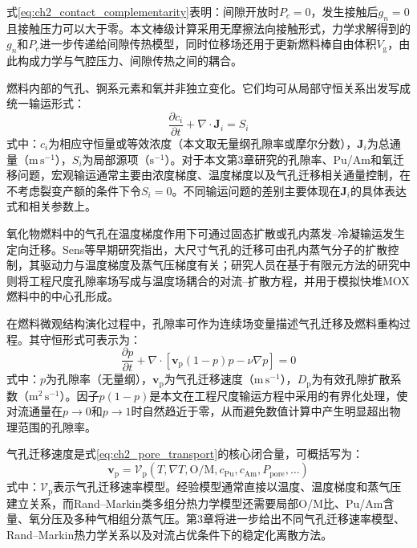 式\eqref{eq:ch2_contact_complementarity}表明：间隙开放时$P_c=0$，发生接触后$g_n=0$且接触压力可以大于零。本文棒级计算采用无摩擦法向接触形式，力学求解得到的$g_n$和$P_c$进一步传递给间隙传热模型，同时位移场还用于更新燃料棒自由体积$V_{\mathrm g}$，由此构成力学与气腔压力、间隙传热之间的耦合。

\label{sec:ch2_transport_governing}

燃料内部的气孔、锕系元素和氧并非独立变化。它们均可从局部守恒关系出发写成统一输运形式：
\begin{equation}
	\frac{\partial c_i}{\partial t}
	+\nabla\cdot\mathbf J_i
	=S_i
	\label{eq:ch2_generic_transport}
\end{equation}
\noindent 式中：$c_i$为相应守恒量或等效浓度（本文取无量纲孔隙率或摩尔分数），$\mathbf J_i$为总通量（$\mathrm{m\,s^{-1}}$），$S_i$为局部源项（$\mathrm{s^{-1}}$）。对于本文第3章研究的孔隙率、Pu/Am和氧迁移问题，宏观输运通常主要由浓度梯度、温度梯度以及气孔迁移相关通量控制，在不考虑裂变产额的条件下令$S_i=0$。不同输运问题的差别主要体现在$\mathbf J_i$的具体表达式和相关参数上。

\label{subsec:ch2_pore_transport}

氧化物燃料中的气孔在温度梯度作用下可通过固态扩散或孔内蒸发--冷凝输运发生定向迁移。Sens等早期研究指出，大尺寸气孔的迁移可由孔内蒸气分子的扩散控制，其驱动力与温度梯度及蒸气压梯度有关\cite{sensKineticsPoreMovement1972}；研究人员在基于有限元方法的研究中则将工程尺度孔隙率场写成与温度场耦合的对流--扩散方程，并用于模拟快堆MOX燃料中的中心孔形成\cite{novasconeModelingPorosityMigration2018}。

在燃料微观结构演化过程中，孔隙率可作为连续场变量描述气孔迁移及燃料重构过程。其守恒形式可表示为：
\begin{equation}
	\frac{\partial p}{\partial t}
	+\nabla\cdot
	\left[
		\mathbf v_{\mathrm p}(1-p)p
		-\nu\nabla p
		\right]
	=0
	\label{eq:ch2_pore_transport}
\end{equation}
\noindent 式中：$p$为孔隙率（无量纲），$\mathbf v_{\mathrm p}$为气孔迁移速度（$\mathrm{m\,s^{-1}}$），$D_{\mathrm p}$为有效孔隙扩散系数（$\mathrm{m^2\,s^{-1}}$）。因子$p(1-p)$是本文在工程尺度输运方程中采用的有界化处理，使对流通量在$p\rightarrow0$和$p\rightarrow1$时自然趋近于零，从而避免数值计算中产生明显超出物理范围的孔隙率。

气孔迁移速度是式\eqref{eq:ch2_pore_transport}的核心闭合量，可概括写为：
\begin{equation}
	\mathbf v_{\mathrm p}
	=\mathcal V_{\mathrm p}
	\left(
	T,\nabla T,\mathrm{O/M},c_{\mathrm{Pu}},c_{\mathrm{Am}},P_{\mathrm{pore}},\ldots
	\right)
	\label{eq:ch2_pore_velocity_closure}
\end{equation}
\noindent 式中：$\mathcal V_{\mathrm p}$表示气孔迁移速率模型。经验模型通常直接以温度、温度梯度和蒸气压建立关系，而Rand--Markin类多组分热力学模型还需要局部O/M比、Pu/Am含量、氧分压及多种气相组分蒸气压。第3章将进一步给出不同气孔迁移速率模型、Rand--Markin热力学关系以及对流占优条件下的稳定化离散方法。

